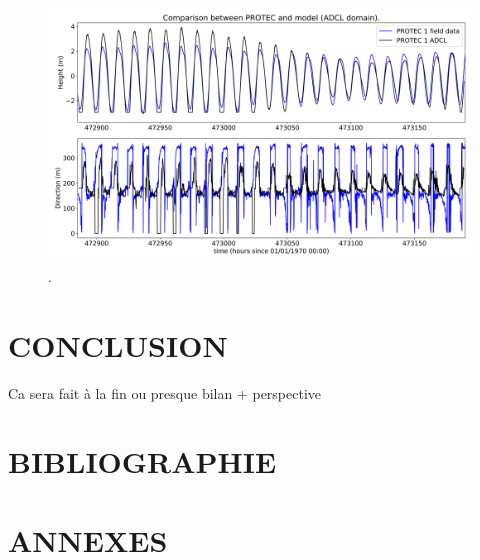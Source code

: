 \documentclass[10pt,a4paper,titlepage]{article}
\begin{document}
\begin{figure}[h!]
    \centering
    \includegraphics[scale=0.4]{../images/post_traitement/Speed_ADCL_PROTEC1.png}
    \caption{.}
    \label{}
\end{figure}


\newpage

\section{CONCLUSION}
\label{sec:conclusion}

Ca sera fait à la fin ou presque
bilan + perspective

\newpage
\section{BIBLIOGRAPHIE}
%
%
\printbibliography

\newpage
\section{ANNEXES}
\label{annexes}
\end{document}
